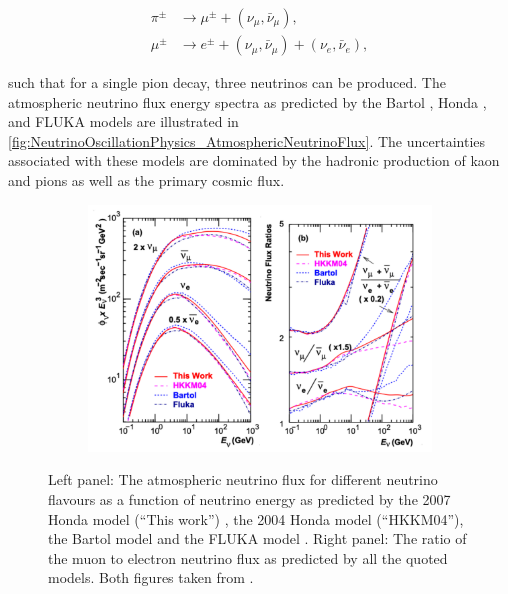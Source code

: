 \begin{equation}
  \label{eq:NeutrinoOscillationPhysics_PionDecay}
  \begin{split}
    \pi^{\pm} &\rightarrow \mu^{\pm} + (\nu_{\mu},\bar{\nu}_\mu), \\
    \mu^{\pm} &\rightarrow e^{\pm} + (\nu_{\mu},\bar{\nu}_\mu) + (\nu_{e},\bar{\nu}_e),
  \end{split}
\end{equation}

such that for a single pion decay, three neutrinos can be produced. The atmospheric neutrino flux energy spectra as predicted by the Bartol \cite{Barr_2004}, Honda \cite{Honda_2007, PhysRevD.70.043008, Honda:2011}, and FLUKA \cite{etde_20239111} models are illustrated in \autoref{fig:NeutrinoOscillationPhysics_AtmosphericNeutrinoFlux}.
The uncertainties associated with these models are dominated by the hadronic production of kaon and pions as well as the primary cosmic flux. 

\begin{figure}[h]
  \begin{subfigure}[t]{0.80\textwidth}
    \includegraphics[width=\textwidth, trim={0mm 0mm 0mm 0mm}, clip,page=1]{Figures/Theory/AtmosphericNuFlux.pdf}
  \end{subfigure}
  \caption{Left panel: The atmospheric neutrino flux for different neutrino flavours as a function of neutrino energy as predicted by the 2007 Honda model (``This work'') \cite{Honda_2007}, the 2004 Honda model (``HKKM04'')\cite{PhysRevD.70.043008}, the Bartol model \cite{Barr_2004} and the FLUKA model \cite{etde_20239111}. Right panel: The ratio of the muon to electron neutrino flux as predicted by all the quoted models. Both figures taken from \cite{Honda_2007}.}
  \label{fig:NeutrinoOscillationPhysics_AtmosphericNeutrinoFlux}
\end{figure}

